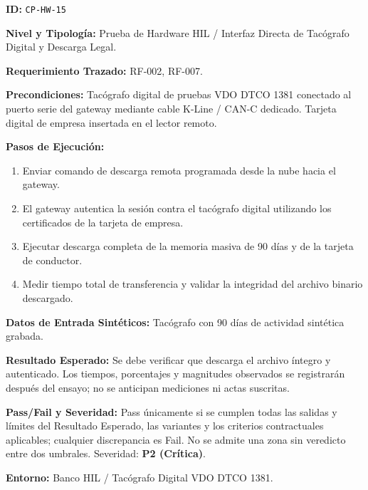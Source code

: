 \par\noindent\textbf{ID:} \texttt{C\allowbreak{}P\allowbreak{}-\allowbreak{}H\allowbreak{}W\allowbreak{}-\allowbreak{}1\allowbreak{}5\allowbreak{}}\par
\par\noindent\textbf{Nivel y Tipología:} Prueba de Hardware HIL / Interfaz Directa de Tacógrafo Digital y Descarga Legal.\par
\par\noindent\textbf{Requerimiento Trazado:} RF-002, RF-007.\par
\par\noindent\textbf{Precondiciones:} Tacógrafo digital de pruebas VDO DTCO 1381 conectado al puerto serie del gateway mediante cable K-Line / CAN-C dedicado. Tarjeta digital de empresa insertada en el lector remoto.\par
\par\noindent\textbf{Pasos de Ejecución:} \par
\begin{enumerate}
\item Enviar comando de descarga remota programada desde la nube hacia el gateway.
\item El gateway autentica la sesión contra el tacógrafo digital utilizando los certificados de la tarjeta de empresa.
\item Ejecutar descarga completa de la memoria masiva de 90 días y de la tarjeta de conductor.
\item Medir tiempo total de transferencia y validar la integridad del archivo binario descargado.
\end{enumerate}
\par\noindent\textbf{Datos de Entrada Sintéticos:} Tacógrafo con 90 días de actividad sintética grabada.\par
\par\noindent\textbf{Resultado Esperado:} Se debe verificar que descarga el archivo íntegro y autenticado. Los tiempos, porcentajes y magnitudes observados se registrarán después del ensayo; no se anticipan mediciones ni actas suscritas.\par
\par\noindent\textbf{Pass/Fail y Severidad:} Pass únicamente si se cumplen todas las salidas y límites del Resultado Esperado, las variantes y los criterios contractuales aplicables; cualquier discrepancia es Fail. No se admite una zona sin veredicto entre dos umbrales. Severidad: \textbf{P2 (Crítica)}.\par
\par\noindent\textbf{Entorno:} Banco HIL / Tacógrafo Digital VDO DTCO 1381.\par



